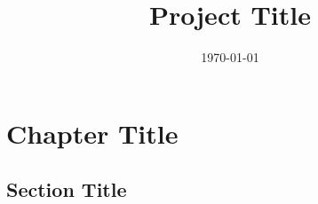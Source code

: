 \documentclass{../../template/texbook}
\title{Project Title}
\author{}
\date{\today}
\begin{document}
    \maketitle

    \chapter{Chapter Title}

    \section{Section Title}

    \printbibliography
\end{document}

